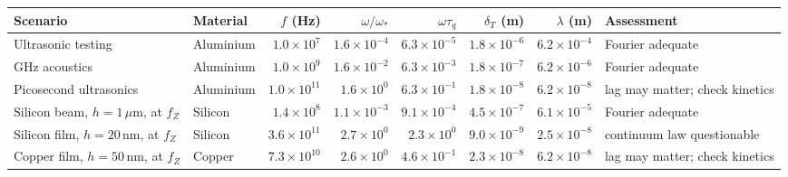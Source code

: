 \setlength{\tabcolsep}{3pt}\begin{tabular}{@{}p{3.0cm}lrrrrrp{2.3cm}@{}}\toprule
Scenario & Material & $f$ (Hz) & $\omega/\omega_*$ & $\omega\tau_q$ & $\delta_T$ (m) & $\lambda$ (m) & Assessment\\\midrule
Ultrasonic testing & Aluminium & $1.0\times10^{7}$ & $1.6\times10^{-4}$ & $6.3\times10^{-5}$ & $1.8\times10^{-6}$ & $6.2\times10^{-4}$ & Fourier adequate\\
GHz acoustics & Aluminium & $1.0\times10^{9}$ & $1.6\times10^{-2}$ & $6.3\times10^{-3}$ & $1.8\times10^{-7}$ & $6.2\times10^{-6}$ & Fourier adequate\\
Picosecond ultrasonics & Aluminium & $1.0\times10^{11}$ & $1.6\times10^{0}$ & $6.3\times10^{-1}$ & $1.8\times10^{-8}$ & $6.2\times10^{-8}$ & lag may matter; check kinetics\\
Silicon beam, $h=1\,\mu$m, at $f_Z$ & Silicon & $1.4\times10^{8}$ & $1.1\times10^{-3}$ & $9.1\times10^{-4}$ & $4.5\times10^{-7}$ & $6.1\times10^{-5}$ & Fourier adequate\\
Silicon film, $h=20$\,nm, at $f_Z$ & Silicon & $3.6\times10^{11}$ & $2.7\times10^{0}$ & $2.3\times10^{0}$ & $9.0\times10^{-9}$ & $2.5\times10^{-8}$ & continuum law questionable\\
Copper film, $h=50$\,nm, at $f_Z$ & Copper & $7.3\times10^{10}$ & $2.6\times10^{0}$ & $4.6\times10^{-1}$ & $2.3\times10^{-8}$ & $6.2\times10^{-8}$ & lag may matter; check kinetics\\
\bottomrule\end{tabular}